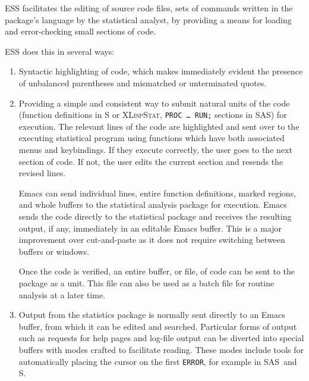 \documentclass{article}
\newcommand*{\SAS}{\textsc{SAS}}
\newcommand*{\XLispStat}{\textsc{XLispStat}}
\newcommand{\stexttt}[1]{{\small\texttt{#1}}}
\begin{document}
ESS facilitates the editing of source code files, sets of commands
written in the package's language by the statistical analyst, by
providing a means for loading and error-checking small sections of
code.  %

ESS does this in several ways:%
\begin{enumerate}
\item %
  Syntactic highlighting of code, which makes immediately evident the
  presence of unbalanced parentheses and mismatched or unterminated
  quotes.%

\item %
  Providing a simple and consistent way to submit natural units of the
  code (function definitions in S or \XLispStat, \stexttt{PROC \dots
    RUN;} sections in \SAS) for execution.  The relevant lines of the
  code are highlighted and sent over to the executing statistical
  program using functions which have both associated menus and keybindings.
  If they execute correctly, the user goes to the next
  section of code.  If not, the user edits the current section and
  resends the revised lines.
  
  Emacs can send individual lines, entire function definitions, marked
  regions, and whole buffers to the statistical analysis package for
  execution.  Emacs sends the code directly to the statistical package
  and receives the resulting output, if any, immediately in an
  editable Emacs buffer.  This is a major improvement over
  cut-and-paste as it does not require switching between buffers or
  windows.
  
  Once the code is verified, an entire buffer, or file, of code can be
  sent to the package as a unit.  This file can also be used as a
  batch file for routine analysis at a later time.

\item Output from the statistics package is normally sent directly to
  an Emacs buffer, from which it can be edited and searched.
  Particular forms of output such as requests for help pages and
  log-file output can be diverted into special buffers with modes
  crafted to facilitate reading.   These modes include tools for 
  automatically placing the cursor on the first \stexttt{ERROR},
  for example in \SAS\ and S. %


\end{enumerate}
\end{document}
